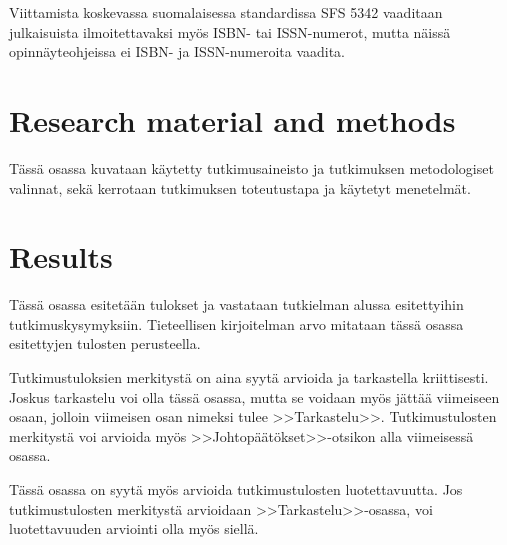 \documentclass[english,12pt,a4paper,pdftex,sci,utf8]{aaltothesis}
\begin{document}
Viittamista koskevassa suomalaisessa standardissa
SFS 5342 \cite{sfs} vaaditaan julkaisuista ilmoitettavaksi my\"os ISBN- tai
ISSN-numerot, mutta n\"aiss\"a opinn\"ayteohjeissa ei ISBN- ja 
ISSN-numeroita vaadita. 

\clearpage

\section{Research material and methods}

T\"ass\"a osassa kuvataan k\"aytetty tutkimusaineisto ja
tutkimuksen metodologiset valinnat, sek\"a
kerrotaan tutkimuksen toteutustapa ja k\"aytetyt menetelm\"at. 

\clearpage

\section{Results}

T\"ass\"a osassa esitet\"a\"an tulokset ja vastataan tutkielman alussa
esitettyihin tutkimuskysymyksiin. Tieteellisen kirjoitelman
arvo mitataan t\"ass\"a osassa esitettyjen tulosten perusteella. 

Tutkimustuloksien merkityst\"a on aina syyt\"a arvioida ja tarkastella
kriittisesti.  Joskus tarkastelu voi olla t\"ass\"a osassa, mutta se
voidaan my\"os j\"att\"a\"a viimeiseen osaan, jolloin viimeisen osan nimeksi
tulee >>Tarkastelu>>. Tutkimustulosten merkityst\"a voi arvioida my\"os
>>Johtop\"a\"at\"okset>>-otsikon alla viimeisess\"a osassa. 

T\"ass\"a osassa on syyt\"a my\"os arvioida tutkimustulosten luotettavuutta.
Jos tutkimustulosten merkityst\"a arvioidaan >>Tarkastelu>>-osassa,
voi luotettavuuden arviointi olla my\"os siell\"a. 

\clearpage
\end{document}
